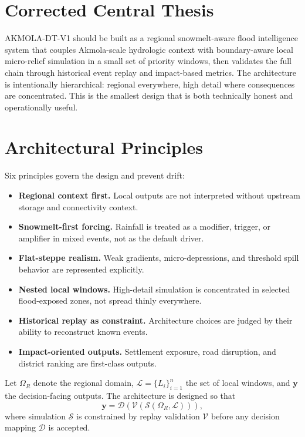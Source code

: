 \documentclass[11pt,a4paper]{article}
\begin{document}
\section{Corrected Central Thesis}

AKMOLA-DT-V1 should be built as a regional snowmelt-aware flood intelligence system that couples Akmola-scale hydrologic context with boundary-aware local micro-relief simulation in a small set of priority windows, then validates the full chain through historical event replay and impact-based metrics. The architecture is intentionally hierarchical: regional everywhere, high detail where consequences are concentrated. This is the smallest design that is both technically honest and operationally useful.

\section{Architectural Principles}

Six principles govern the design and prevent drift:

\begin{itemize}
  \item \textbf{Regional context first.} Local outputs are not interpreted without upstream storage and connectivity context.
  \item \textbf{Snowmelt-first forcing.} Rainfall is treated as a modifier, trigger, or amplifier in mixed events, not as the default driver.
  \item \textbf{Flat-steppe realism.} Weak gradients, micro-depressions, and threshold spill behavior are represented explicitly.
  \item \textbf{Nested local windows.} High-detail simulation is concentrated in selected flood-exposed zones, not spread thinly everywhere.
  \item \textbf{Historical replay as constraint.} Architecture choices are judged by their ability to reconstruct known events.
  \item \textbf{Impact-oriented outputs.} Settlement exposure, road disruption, and district ranking are first-class outputs.
\end{itemize}

Let $\Omega_R$ denote the regional domain, $\mathcal{L}=\{L_i\}_{i=1}^{n}$ the set of local windows, and $\mathbf{y}$ the decision-facing outputs. The architecture is designed so that
\[
\mathbf{y} = \mathcal{D}\!\left(\mathcal{V}\!\left(\mathcal{S}(\Omega_R,\mathcal{L})\right)\right),
\]
where simulation $\mathcal{S}$ is constrained by replay validation $\mathcal{V}$ before any decision mapping $\mathcal{D}$ is accepted.
\end{document}
